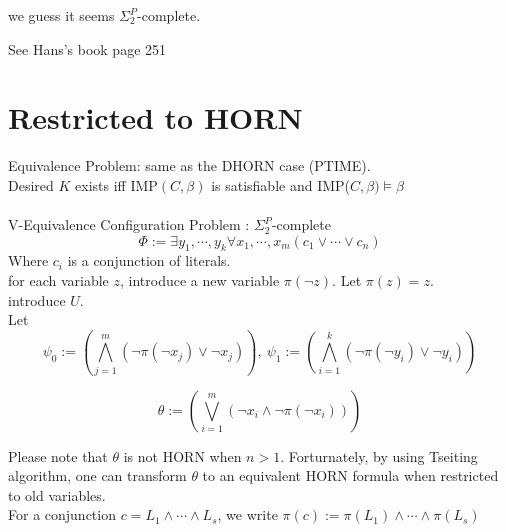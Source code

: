 \documentclass[12pt]{article}
\begin{document}
{%


we guess it seems $\Sigma_2^P$-complete.

See Hans's book page 251


\section{Restricted to HORN}


Equivalence Problem: same as the DHORN case (PTIME).\\

Desired $K$ exists iff IMP$(C,\beta)$ is satisfiable and IMP($C,\beta)\models \beta$\\ 

\ \\

V-Equivalence Configuration Problem :  $\Sigma_2^P$-complete\\ 


$$\Phi:=\exists y_1,\cdots, y_k \forall x_1,\cdots, x_m \left(c_1\vee\cdots\vee c_n \right)$$
%
Where $c_i$ is a conjunction of literals.\\

for each variable $z$, introduce a new variable $\pi(\neg z)$. Let $\pi(z)=z$.\\

introduce $U$.\\

Let $$\psi_0:=\left(\bigwedge_{j=1}^m (\neg \pi(\neg x_j)\vee \neg x_j)\right), \ \psi_1:= \left(\bigwedge_{i=1}^k(\neg \pi(\neg y_i)\vee \neg y_i)\right)$$

$$\theta:=\left(\bigvee_{i=1}^m (\neg x_i\wedge \neg\pi(\neg x_i))\right)$$


Please note that $\theta$ is not HORN  when $n>1$. Forturnately, by using Tseiting algorithm, one can transform  $\theta$ to an equivalent HORN formula when restricted to old variables. \\  



For a conjunction $c=L_1\wedge\cdots\wedge L_s$, we write 
$\pi(c):=\pi(L_1)\wedge\cdots\wedge \pi(L_s)$


}
\end{document}
